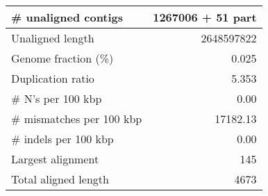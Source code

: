 \documentclass[12pt,a4paper]{article}
\begin{document}
\begin{table}[ht]
\begin{center}
\begin{tabular}{|l*{1}{|r}|}
\# unaligned contigs & 1267006 + 51 part \\ \hline
Unaligned length & 2648597822 \\ \hline
Genome fraction (\%) & 0.025 \\ \hline
Duplication ratio & 5.353 \\ \hline
\# N's per 100 kbp & 0.00 \\ \hline
\# mismatches per 100 kbp & 17182.13 \\ \hline
\# indels per 100 kbp & 0.00 \\ \hline
Largest alignment & 145 \\ \hline
Total aligned length & 4673 \\ \hline
\end{tabular}
\end{center}
\end{table}
\end{document}
